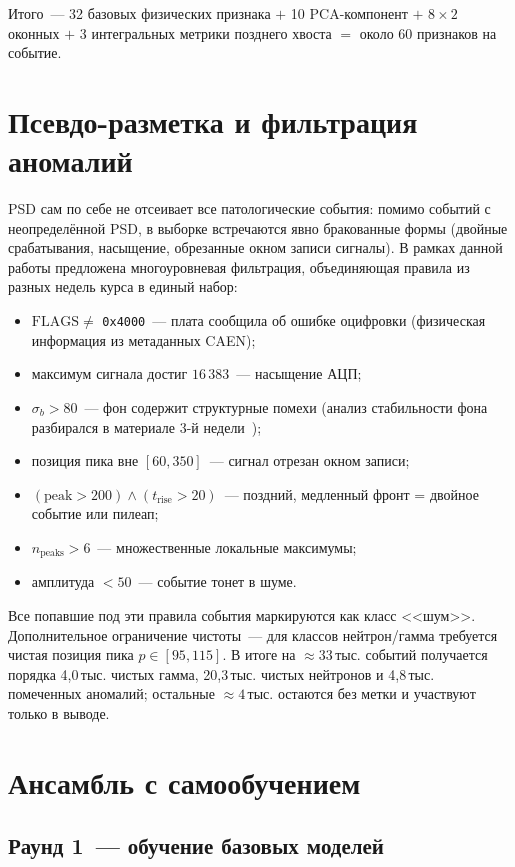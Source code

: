 \documentclass[11pt,a4paper]{article}
\begin{document}
Итого~--- 32 базовых физических признака $+$ 10 PCA-компонент $+$
$8 \times 2$ оконных $+$ 3 интегральных метрики позднего хвоста
$=$ около 60 признаков на событие.

\section{Псевдо-разметка и фильтрация аномалий}

PSD сам по себе не отсеивает все патологические события: помимо
событий с неопределённой PSD, в выборке встречаются явно бракованные
формы (двойные срабатывания, насыщение, обрезанные окном записи
сигналы). В рамках данной работы предложена многоуровневая
фильтрация, объединяющая правила из разных недель курса в единый
набор:

\begin{itemize}
\item $\mathrm{FLAGS} \ne$ \texttt{0x4000}~--- плата сообщила об
  ошибке оцифровки (физическая информация из метаданных CAEN);
\item максимум сигнала достиг $16\,383$~--- насыщение АЦП;
\item $\sigma_b > 80$~--- фон содержит структурные помехи (анализ
  стабильности фона разбирался в материале 3-й недели~\cite{lr3});
\item позиция пика вне $[60, 350]$~--- сигнал отрезан окном записи;
\item $(\text{peak} > 200) \land (t_\text{rise} > 20)$~--- поздний,
  медленный фронт = двойное событие или пилеап;
\item $n_\text{peaks} > 6$~--- множественные локальные максимумы;
\item амплитуда $< 50$~--- событие тонет в шуме.
\end{itemize}

Все попавшие под эти правила события маркируются как класс <<шум>>.
Дополнительное ограничение чистоты~--- для классов нейтрон/гамма
требуется чистая позиция пика $p \in [95, 115]$.
В итоге на $\approx 33$\,тыс. событий получается порядка 4{,}0\,тыс.
чистых гамма, 20{,}3\,тыс. чистых нейтронов и 4{,}8\,тыс. помеченных
аномалий; остальные $\approx 4$\,тыс. остаются без метки и участвуют
только в выводе.

\section{Ансамбль с самообучением}

\subsection{Раунд 1~--- обучение базовых моделей}
\end{document}
